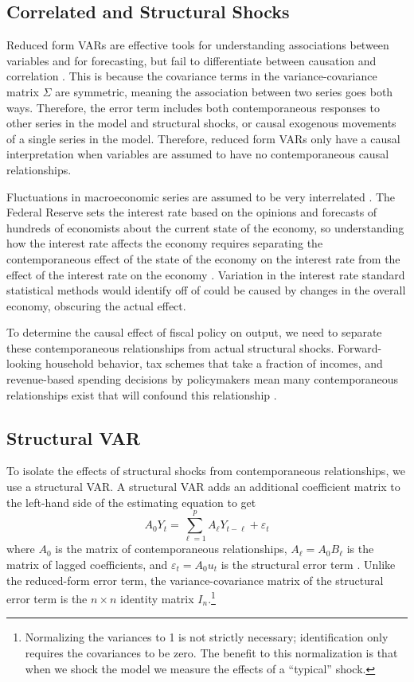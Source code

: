 \subsection{Correlated and Structural Shocks}

Reduced form VARs are effective tools for understanding associations between variables and for forecasting, but fail to differentiate between causation and correlation \parencite{stock2001vector}. This is because the covariance terms in the variance-covariance matrix $\Sigma$ are symmetric, meaning the association between two series goes both ways. Therefore, the error term includes both contemporaneous responses to other series in the model and structural shocks, or causal exogenous movements of a single series in the model. Therefore, reduced form VARs only have a causal interpretation when variables are assumed to have no contemporaneous causal relationships.

Fluctuations in macroeconomic series are assumed to be very interrelated \parencites{sims1980macroeconomics}{shapiro1988sources}{blanchard1988dynamic}{cochrane1994shocks}{nakamura2018identification}. The Federal Reserve sets the interest rate based on the opinions and forecasts of hundreds of economists about the current state of the economy, so understanding how the interest rate affects the economy requires separating the contemporaneous effect of the state of the economy on the interest rate from the effect of the interest rate on the economy \parencite{nakamura2018identification}. Variation in the interest rate standard statistical methods would identify off of could be caused by changes in the overall economy, obscuring the actual effect.

To determine the causal effect of fiscal policy on output, we need to separate these contemporaneous relationships from actual structural shocks. Forward-looking household behavior, tax schemes that take a fraction of incomes, and revenue-based spending decisions by policymakers mean many contemporaneous relationships exist that will confound this relationship \parencites{blanchard2002empirical}{gali2020effects}.


\subsection{Structural VAR} \label{subsec:svar}

To isolate the effects of structural shocks from contemporaneous relationships, we use a structural VAR. A structural VAR adds an additional coefficient matrix to the left-hand side of the estimating equation to get
\[
    A_0 Y_t = \sum_{\ell = 1}^p A_\ell Y_{t - \ell} + \varepsilon_t
\]
where $A_0$ is the matrix of contemporaneous relationships, $A_\ell = A_0 B_\ell$ is the matrix of lagged coefficients, and $\varepsilon_t = A_0 u_t$ is the structural error term \parencite{neusser2016time}. Unlike the reduced-form error term, the variance-covariance matrix of the structural error term is the $n \times n$ identity matrix $I_n$.\footnote{Normalizing the variances to 1 is not strictly necessary; identification only requires the covariances to be zero. The benefit to this normalization is that when we shock the model we measure the effects of a ``typical'' shock.}

